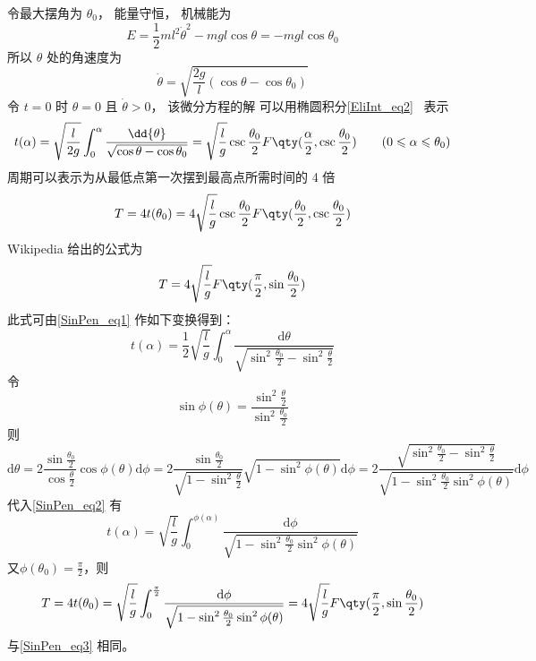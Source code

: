 

令最大摆角为 $\theta_0$， 能量守恒， 机械能为
\begin{equation}
E = \frac{1}{2} m l^2 \dot \theta^2 - mg l \cos\theta = - mg l \cos\theta_0
\end{equation}
所以 $\theta$ 处的角速度为
\begin{equation}
\dot{\theta} = \sqrt{\frac{2g}{l} (\cos\theta - \cos\theta_0) }
\end{equation}
令 $t = 0$ 时 $\theta = 0$ 且 $\dot{\theta} > 0$， 该微分方程的解%
可以用椭圆积分\autoref{EliInt_eq2}~ 表示
\begin{equation}\label{SinPen_eq1}
t(\alpha) = \sqrt{\frac{l}{2g}} \int_0^{\alpha} \frac{\dd{\theta}}{\sqrt{\cos\theta - \cos\theta_0}}
= \sqrt{\frac{l}{g}} \csc\frac{\theta_0}{2} F\qty(\frac{\alpha}{2}, \csc\frac{\theta_0}{2})
\qquad (0 \leqslant \alpha \leqslant \theta_0)
\end{equation}
周期可以表示为从最低点第一次摆到最高点所需时间的 4 倍
\begin{equation}
T = 4t(\theta_0) = 4 \sqrt{\frac{l}{g}} \csc\frac{\theta_0}{2} F\qty(\frac{\theta_0}{2}, \csc\frac{\theta_0}{2})
\end{equation}
Wikipedia 给出的公式为
\begin{equation}\label{SinPen_eq3}
T = 4 \sqrt{\frac{l}{g}} F\qty(\frac{\pi}{2}, \sin\frac{\theta_0}{2})
\end{equation}
此式可由\autoref{SinPen_eq1} 作如下变换得到：
\begin{equation}\label{SinPen_eq2}
t(\alpha)=\frac12\sqrt{\frac{l}{g}}\int_{0}^{\alpha}\frac{\mathrm{d}\theta}{\sqrt{\sin^2\frac{\theta_0}2-\sin^2\frac{\theta}2}}
\end{equation}
令
\begin{equation}
\sin \phi(\theta)=\frac{\sin^2\frac{\theta}2}{\sin^2\frac{\theta_0}2}
\end{equation}
则
\begin{equation}
\mathrm d\theta=2\frac{\sin\frac{\theta_0}2}{\cos\frac{\theta}2}\cos\phi(\theta)\mathrm d\phi
=2\frac{\sin\frac{\theta_0}2}{\sqrt{1-\sin^2\frac{\theta}2}}\sqrt{1-\sin^2\phi(\theta)}\mathrm d\phi
=2\frac{\sqrt{\sin^2\frac{\theta_0}2-\sin^2\frac{\theta}2}}{\sqrt{1-\sin^2\frac{\theta_0}2\sin^2{\phi(\theta)}}}\mathrm d\phi
\end{equation}
代入\autoref{SinPen_eq2} 有
\begin{equation}
t(\alpha)=\sqrt{\frac{l}{g}}\int_{0}^{\phi(\alpha)}\frac{\mathrm{d}\phi}{\sqrt{1-\sin^2\frac{\theta_0}2\sin^2{\phi(\theta)}}}
\end{equation}
又$\phi(\theta_0)=\frac\pi2$，则
\begin{equation}
T=4t(\theta_0)=\sqrt{\frac{l}{g}}\int_{0}^{\frac\pi2}\frac{\mathrm{d}\phi}{\sqrt{1-\sin^2\frac{\theta_0}2\sin^2{\phi(\theta)}}}=4 \sqrt{\frac{l}{g}} F\qty(\frac{\pi}{2}, \sin\frac{\theta_0}{2})
\end{equation}
与\autoref{SinPen_eq3} 相同。


